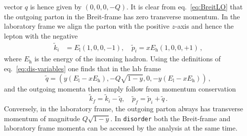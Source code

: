 \documentclass[submission, PhysCodeb]{SciPost_better_arXiv}
\newcommand{\disorder}{{\tt disorder}}
\begin{document}
vector $q$ is hence given by $(0,0,0,-Q)$. It is clear from
eq.~\eqref{eq:BreitLO} that the outgoing parton in the Breit-frame has
zero transverse momentum. In the laboratory frame we align the parton
with the positive $z$-axis and hence the lepton with the negative
\begin{align}
\tilde{k}_i &= E_\mathrm{l}\left(1,0,0,-1 \right), \quad  \tilde{p}_i = x E_\mathrm{h}\left(1,0,0,+1 \right)\,, 
\end{align}
where $E_\mathrm{h}$ is the energy of the incoming hadron. Using the
definitions of eq.~\eqref{eq:dis-variables} one finds that in the lab
frame
\begin{equation}
  \tilde{q} = \left(y(E_\mathrm{l} - x E_\mathrm{h}), -Q\sqrt{1-y},0, -y(E_\mathrm{l} - x E_\mathrm{h})\right)\,, 
\end{equation}
and the outgoing momenta then simply follow from momentum conservation
\begin{equation}
  \label{eq:LabLO}
  \tilde{k}_f = \tilde{k}_i - \tilde{q}, \quad   \tilde{p}_f = \tilde{p}_i + \tilde{q}\,. 
\end{equation}
Conversely, in the laboratory frame, the outgoing parton always has
transverse momentum of magnitude $Q\sqrt{1-y}$. In \disorder{} both
the Breit-frame and laboratory frame momenta can be accessed by the
analysis at the same time.
\end{document}

